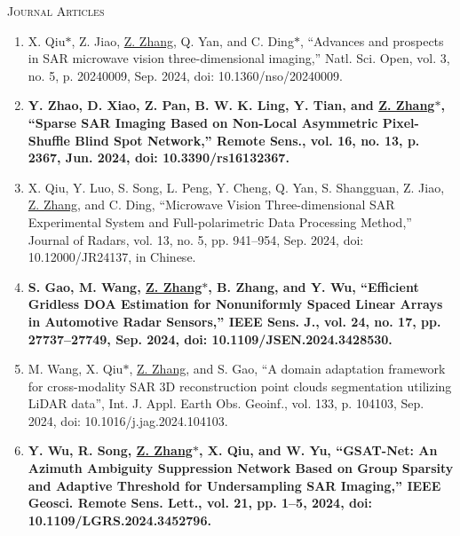 \documentclass[paper=a4,fontsize=11pt]{scrartcl}
\begin{document}
%
%

\textsc{Journal Articles}

\begin{enumerate}

\item X. Qiu$\ast$, Z. Jiao, \underline{Z. Zhang}, Q. Yan, and C. Ding$\ast$, ``Advances and prospects in SAR microwave vision three-dimensional imaging,'' Natl. Sci. Open, vol. 3, no. 5, p. 20240009, Sep. 2024, doi: 10.1360/nso/20240009.
	
\item \textbf{Y. Zhao, D. Xiao, Z. Pan, B. W. K. Ling, Y. Tian, and \underline{Z. Zhang$\ast$}, ``Sparse SAR Imaging Based on Non-Local Asymmetric Pixel-Shuffle Blind Spot Network,'' Remote Sens., vol. 16, no. 13, p. 2367, Jun. 2024, doi: 10.3390/rs16132367.}

\item X. Qiu, Y. Luo, S. Song, L. Peng, Y. Cheng, Q. Yan, S. Shangguan, Z. Jiao, \underline{Z. Zhang}, and C. Ding, ``Microwave Vision Three-dimensional SAR Experimental System and Full-polarimetric Data Processing Method,'' Journal of Radars, vol. 13, no. 5, pp. 941–954, Sep. 2024, doi: 10.12000/JR24137, in Chinese.

\item \textbf{S. Gao, M. Wang, \underline{Z. Zhang$\ast$}, B. Zhang, and Y. Wu, ``Efficient Gridless DOA Estimation for Nonuniformly Spaced Linear Arrays in Automotive Radar Sensors,'' IEEE Sens. J., vol. 24, no. 17, pp. 27737–27749, Sep. 2024, doi: 10.1109/JSEN.2024.3428530.}

\item M. Wang, X. Qiu$\ast$, \underline{Z. Zhang}, and S. Gao, ``A domain adaptation framework for cross-modality SAR 3D reconstruction point clouds segmentation utilizing LiDAR data'', Int. J. Appl. Earth Obs. Geoinf., vol. 133, p. 104103, Sep. 2024, doi: 10.1016/j.jag.2024.104103.

\item \textbf{Y. Wu, R. Song, \underline{Z. Zhang$\ast$}, X. Qiu, and W. Yu, ``GSAT-Net: An Azimuth Ambiguity Suppression Network Based on Group Sparsity and Adaptive Threshold for Undersampling SAR Imaging,'' IEEE Geosci. Remote Sens. Lett., vol. 21, pp. 1–5, 2024, doi: 10.1109/LGRS.2024.3452796.}


\end{enumerate}
\end{document}
